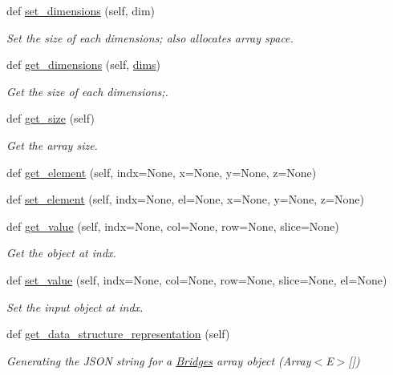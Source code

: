 \begin{DoxyCompactItemize}
def \mbox{\hyperlink{class_bridges_1_1_array_1_1_array_a496265932c2d4eeefd3605210afb93f9}{set\+\_\+dimensions}} (self, dim)
\begin{DoxyCompactList}\small\item\em Set the size of each dimensions; also allocates array space. \end{DoxyCompactList}\item 
def \mbox{\hyperlink{class_bridges_1_1_array_1_1_array_a7ad57c2bd46d18fbff99dd19cd88ba68}{get\+\_\+dimensions}} (self, \mbox{\hyperlink{class_bridges_1_1_array_1_1_array_a309aee1788e19f49aff298155b9b7c39}{dims}})
\begin{DoxyCompactList}\small\item\em Get the size of each dimensions;. \end{DoxyCompactList}\item 
def \mbox{\hyperlink{class_bridges_1_1_array_1_1_array_a6b3843b3cd57ab072c7db1ca6c107d1d}{get\+\_\+size}} (self)
\begin{DoxyCompactList}\small\item\em Get the array size. \end{DoxyCompactList}\item 
def \mbox{\hyperlink{class_bridges_1_1_array_1_1_array_a3bc6a21dcf8792e45e39129044d186db}{get\+\_\+element}} (self, indx=None, x=None, y=None, z=None)
\item 
def \mbox{\hyperlink{class_bridges_1_1_array_1_1_array_a8a8ed85d66efca1049351abab01ab9c3}{set\+\_\+element}} (self, indx=None, el=None, x=None, y=None, z=None)
\item 
def \mbox{\hyperlink{class_bridges_1_1_array_1_1_array_a45379fc5c5b5c039ac75b01cd40195dd}{get\+\_\+value}} (self, indx=None, col=None, row=None, slice=None)
\begin{DoxyCompactList}\small\item\em Get the object at \textquotesingle{}indx\textquotesingle{}. \end{DoxyCompactList}\item 
def \mbox{\hyperlink{class_bridges_1_1_array_1_1_array_a900af8a17ee9cac42e2d23b00562a783}{set\+\_\+value}} (self, indx=None, col=None, row=None, slice=None, el=None)
\begin{DoxyCompactList}\small\item\em Set the input object at \textquotesingle{}indx\textquotesingle{}. \end{DoxyCompactList}\item 
def \mbox{\hyperlink{class_bridges_1_1_array_1_1_array_a2ff4613545bb6df7554b8f87fc7473fd}{get\+\_\+data\+\_\+structure\+\_\+representation}} (self)
\begin{DoxyCompactList}\small\item\em Generating the J\+S\+ON string for a \mbox{\hyperlink{namespace_bridges_1_1_bridges}{Bridges}} array object (Array$<$\+E$>$\mbox{[}\mbox{]}) \end{DoxyCompactList}\end{DoxyCompactItemize}
